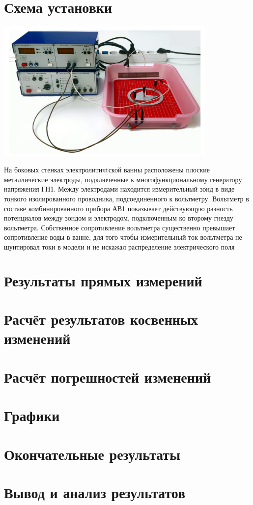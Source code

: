 \documentclass[12pt]{extarticle}
\begin{document}
    \section{Схема установки}
    \begin{minipage}{0.5\textwidth}
        \includegraphics[height=7cm]{image.png}
    \end{minipage}
    \hfill
    \begin{minipage}{0.4\textwidth}
        На боковых стенках электролитичtской ванны
        расположены плоские металлические электроды,
        подключенные к многофункциональному генератору напряжения ГН1.
        Между электродами находится измерительный зонд в виде 
        тонкого изолированного проводника, подсоединенного к вольтметру.
        Вольтметр в составе комбинированного прибора АВ1 показывает
        действующую разность потенциалов между зондом и электродом,
        подключенным ко второму гнезду вольтметра. Собственное 
        сопротивление вольтметра существенно превышает сопротивление
        воды в ванне, для того чтобы измерительный ток вольтметра не
        шунтировал токи в модели и не искажал распределение электрического поля
    \end{minipage}

    \section{Результаты прямых измерений}

    \section{Расчёт результатов косвенных изменений}

    \section{Расчёт погрешностей изменений}
 
    \section{Графики}

    \section{Окончательные результаты}

    \section{Вывод и анализ результатов}

    
\end{document}
